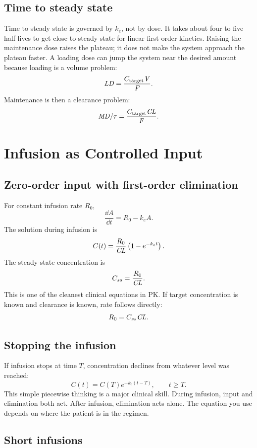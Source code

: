 \documentclass[a4paper]{article}
\newcommand{\pkCL}{\pksym{CL}}
\newcommand{\pkV}{\pksym{V}}
\newcommand{\pkF}{\pksym{F}}
\newcommand{\pkCss}{C_{ss}}
\newcommand{\pkke}{k_e}
\begin{document}
\figureMultipleDosing

\subsection{Time to steady state}

Time to steady state is governed by \(k_e\), not by dose. It takes about four to five half-lives to get close to steady state for linear first-order kinetics. Raising the maintenance dose raises the plateau; it does not make the system approach the plateau faster. A loading dose can jump the system near the desired amount because loading is a volume problem:
\[
  \pksym{LD}=\frac{C_{\pklab{target}}\pkV}{\pkF}.
\]
Maintenance is then a clearance problem:
\[
  \pksym{MD}/\tau=\frac{C_{\pklab{target}}\pkCL}{\pkF}.
\]

\section{Infusion as Controlled Input}

\subsection{Zero-order input with first-order elimination}

For constant infusion rate \(R_0\),
\[
  \frac{\dd A}{\dd t}=R_0-\pkke A.
\]
The solution during infusion is
\[
  C(t)=\frac{R_0}{\pkCL}\left(1-e^{-\pkke t}\right).
\]
The steady-state concentration is
\[
  \pkCss=\frac{R_0}{\pkCL}.
\]
This is one of the cleanest clinical equations in PK. If target concentration is known and clearance is known, rate follows directly:
\[
  R_0=\pkCss\pkCL.
\]

\subsection{Stopping the infusion}

If infusion stops at time \(T\), concentration declines from whatever level was reached:
\[
  C(t)=C(T)e^{-\pkke(t-T)},\qquad t\ge T.
\]
This simple piecewise thinking is a major clinical skill. During infusion, input and elimination both act. After infusion, elimination acts alone. The equation you use depends on where the patient is in the regimen.

\subsection{Short infusions}
\end{document}
